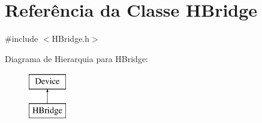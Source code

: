 \hypertarget{classHBridge}{\section{Referência da Classe H\-Bridge}
\label{classHBridge}
}


{\ttfamily \#include $<$H\-Bridge.\-h$>$}

Diagrama de Hierarquia para H\-Bridge\-:\begin{figure}[H]
\begin{center}
\leavevmode
\includegraphics[height=2.000000cm]{classHBridge}
\end{center}
\end{figure}
